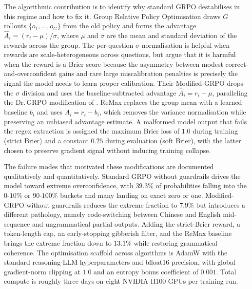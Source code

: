 The algorithmic contribution is to identify why standard GRPO destabilises in this
regime and how to fix it. Group Relative Policy Optimisation \citep{Shao2024deepseek}
draws $G$ rollouts $\{o_1, \dots, o_G\}$ from the old policy and forms the advantage
$\hat A_i = (r_i - \mu) / \sigma$, where $\mu$ and $\sigma$ are the mean and
standard deviation of the rewards across the group. The per-question $\sigma$
normalisation is helpful when rewards are scale-heterogeneous across questions, but
\citet{Turtel2025} argue that it is harmful when the reward is a Brier score because
the asymmetry between modest correct-and-overconfident gains and rare large
miscalibration penalties is precisely the signal the model needs to learn proper
calibration. Their Modified-GRPO drops the $\sigma$ division and uses the
baseline-subtracted advantage $\hat A_i = r_i - \mu$, paralleling the Dr.\,GRPO
modification of \citet{Liu2025DrGRPO}. ReMax \citep{LiReMax2023} replaces the group
mean with a learned baseline $b_i$ and uses $\hat A_i = r_i - b_i$, which removes
the variance normalisation while preserving an unbiased advantage estimate. A
malformed model output that fails the regex extraction is assigned the maximum
Brier loss of $1.0$ during training (strict Brier) and a constant $0.25$ during
evaluation (soft Brier), with the latter chosen to preserve gradient signal without
inducing training collapse.

The failure modes that motivated these modifications are documented qualitatively
and quantitatively. Standard GRPO without guardrails drives the model toward
extreme overconfidence, with $39.3\%$ of probabilities falling into the $0$-$10\%$
or $90$-$100\%$ buckets and many landing on exact zero or one. Modified-GRPO
without guardrails reduces the extreme fraction to $7.9\%$ but introduces a
different pathology, namely code-switching between Chinese and English mid-sequence
and ungrammatical partial outputs. Adding the strict-Brier reward, a token-length
cap, an early-stopping gibberish filter, and the ReMax baseline brings the extreme
fraction down to $13.1\%$ while restoring grammatical coherence. The optimisation
scaffold across algorithms is AdamW with the standard reasoning-LLM hyperparameters
and bfloat16 precision, with global gradient-norm clipping at $1.0$ and an entropy
bonus coefficient of $0.001$. Total compute is roughly three days on eight NVIDIA
H100 GPUs per training run.

